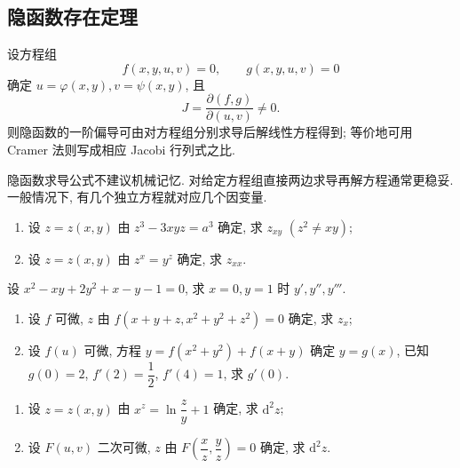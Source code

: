 \documentclass[../../数学分析培优讲义.tex]{subfiles}
\begin{document}
\subsection{隐函数存在定理}

\begin{theorem}[\markstar]
设方程组
\[
    f(x,y,u,v)=0,\qquad g(x,y,u,v)=0
\]
确定 $u=\varphi(x,y),v=\psi(x,y)$, 且
\[
    J=\dfrac{\partial(f,g)}{\partial(u,v)}\ne0.
\]
则隐函数的一阶偏导可由对方程组分别求导后解线性方程得到; 等价地可用 Cramer 法则写成相应 Jacobi 行列式之比.
\end{theorem}

\begin{remark}
隐函数求导公式不建议机械记忆. 对给定方程组直接两边求导再解方程通常更稳妥. 一般情况下, 有几个独立方程就对应几个因变量.
\end{remark}




\begin{example}
\begin{enumerate}[label=(\arabic*)]
    \item 设 $z=z(x,y)$ 由 $z^3-3xyz=a^3$ 确定, 求 $z_{xy}$ $(z^2\ne xy)$;
    \item 设 $z=z(x,y)$ 由 $z^x=y^z$ 确定, 求 $z_{xx}$.
\end{enumerate}
\end{example}
\exampleblank

\begin{example}
设 $x^2-xy+2y^2+x-y-1=0$, 求 $x=0,y=1$ 时 $y',y'',y'''$.
\end{example}
\exampleblank

\begin{example}
\begin{enumerate}[label=(\arabic*)]
    \item 设 $f$ 可微, $z$ 由 $f(x+y+z,x^2+y^2+z^2)=0$ 确定, 求 $z_x$;
    \item 设 $f(u)$ 可微, 方程 $y=f(x^2+y^2)+f(x+y)$ 确定 $y=g(x)$, 已知 $g(0)=2$, $f'(2)=\dfrac{1}{2}$, $f'(4)=1$, 求 $g'(0)$.
\end{enumerate}
\end{example}
\exampleblank

\begin{example}
\begin{enumerate}[label=(\arabic*)]
    \item 设 $z=z(x,y)$ 由 $\displaystyle x^z=\ln\dfrac{z}{y}+1$ 确定, 求 $\mathrm{d}^2z$;
    \item 设 $F(u,v)$ 二次可微, $z$ 由 $\displaystyle F\left(\dfrac{x}{z},\dfrac{y}{z}\right)=0$ 确定, 求 $\mathrm{d}^2z$.
\end{enumerate}
\end{example}
\exampleblank
\end{document}
